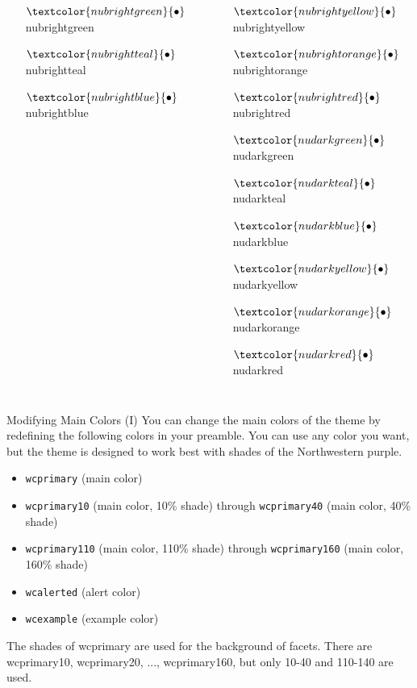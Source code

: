 \documentclass[aspectratio=1610]{beamer}
\begin{document}
\begin{frame}
\begin{columns}
\begin{itemize}
        \item[$\textcolor{nubrightgreen}{\bullet}$] \textcolor{nubrightgreen}{nubrightgreen}
        \item[$\textcolor{nubrightteal}{\bullet}$] \textcolor{nubrightteal}{nubrightteal}
        \item[$\textcolor{nubrightblue}{\bullet}$] \textcolor{nubrightblue}{nubrightblue}
    \end{itemize}
    \begin{itemize}
        \item[$\textcolor{nubrightyellow}{\bullet}$] \textcolor{nubrightyellow}{nubrightyellow}
        \item[$\textcolor{nubrightorange}{\bullet}$] \textcolor{nubrightorange}{nubrightorange}
        \item[$\textcolor{nubrightred}{\bullet}$] \textcolor{nubrightred}{nubrightred}
        \item[$\textcolor{nudarkgreen}{\bullet}$] \textcolor{nudarkgreen}{nudarkgreen}
        \item[$\textcolor{nudarkteal}{\bullet}$] \textcolor{nudarkteal}{nudarkteal}
        \item[$\textcolor{nudarkblue}{\bullet}$] \textcolor{nudarkblue}{nudarkblue}
        \item[$\textcolor{nudarkyellow}{\bullet}$] \textcolor{nudarkyellow}{nudarkyellow}
        \item[$\textcolor{nudarkorange}{\bullet}$] \textcolor{nudarkorange}{nudarkorange}
        \item[$\textcolor{nudarkred}{\bullet}$] \textcolor{nudarkred}{nudarkred}
    \end{itemize}
    \end{columns}
\end{frame}

\begin{frame}{Modifying Main Colors (I)}
    You can change the main colors of the theme by redefining the following colors in your preamble. You can use any color you want, but the theme is designed to work best with shades of the Northwestern purple.
    \begin{itemize}
        \item \texttt{wcprimary} (main color)
        \item \texttt{wcprimary10} (main color, 10\% shade) through \texttt{wcprimary40} (main color, 40\% shade)
        \item \texttt{wcprimary110} (main color, 110\% shade) through \texttt{wcprimary160} (main color, 160\% shade)
        \item \texttt{wcalerted} (alert color)
        \item \texttt{wcexample} (example color)
    \end{itemize}
   The shades of wcprimary are used for the background of facets. There are wcprimary10, wcprimary20, ..., wcprimary160, but only 10-40 and 110-140 are used.
\end{frame}
\end{document}
